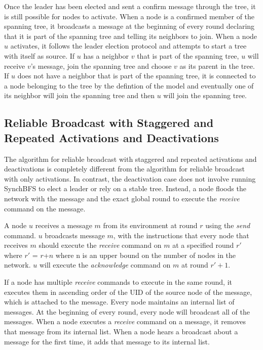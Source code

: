 \documentclass[english]{article}
\begin{document}
Once the leader has been elected and sent a confirm message through the tree, it is still possible for nodes to activate. When a node is a confirmed member of the spanning tree, it broadcasts a message at the beginning of every round declaring that it is part of the spanning tree and telling its neighbors to join. When a node $u$ activates, it follows the leader election protocol and attempts to start a tree with itself as source. If $u$ has a neighbor $v$ that is part of the spanning tree, $u$ will receive $v$'s message, join the spanning tree and choose $v$ as its parent in the tree. If $u$ does not have a neighbor that is part of the spanning tree, it is connected to a node belonging to the tree by the defintion of the model and eventually one of its neighbor will join the spanning tree and then $u$ will join the spanning tree.


  \subsection {Reliable Broadcast with Staggered and Repeated Activations and Deactivations}

The algorithm for reliable broadcast with staggered and repeated activations and deactivations is completely different from the algorithm for reliable broadcast with only activations. In contrast, the deactivation case does not involve running SynchBFS to elect a leader or rely on a stable tree. Instead, a node floods the network with the message and the exact global round to execute the \textit{receive} command on the message.


A node $u$ receives a message $m$ from its environment at round $r$ using the \textit{send} command. $u$ broadcasts message $m$, with the instructions that every node that receives $m$ should execute the \textit{receive} command on $m$ at a specified round $r'$ where $r'$ = $r$+$n$ where n is an upper bound on the number of nodes in the network. $u$ will execute the \textit{acknowledge} command on $m$ at round $r' + 1$.


If a node has multiple \textit{receive} commands to execute in the same round, it executes them in ascending order of the UID of the source node of the message, which is attached to the message. Every node maintains an internal list of messages. At the beginning of every round, every node will broadcast all of the messages. When a node executes a \textit{receive} command on a message, it removes that message from its internal list.  When a node hears a broadcast about a message for the first time, it adds that message to its internal list.
\end{document}
